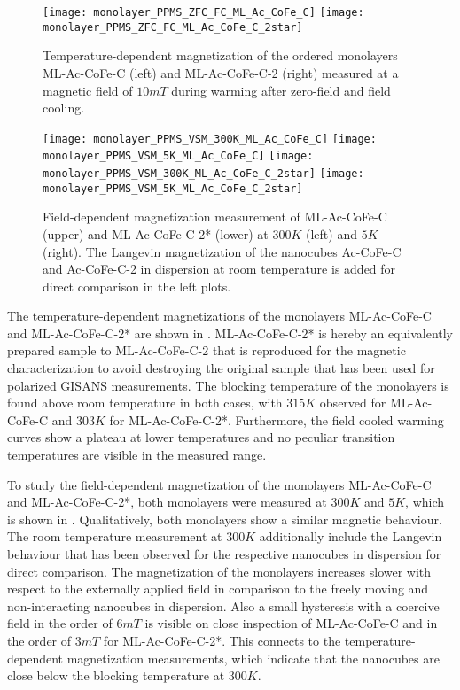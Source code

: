 \documentclass[\main/dresen_thesis.tex]{subfiles}
\begin{document}
  \label{sec:monolayers:magneticStructure:vsm}
  \begin{figure}[tb]
    \centering
    \texttt{[image: monolayer\_PPMS\_ZFC\_FC\_ML\_Ac\_CoFe\_C]}
    \texttt{[image: monolayer\_PPMS\_ZFC\_FC\_ML\_Ac\_CoFe\_C\_2star]}
    \caption{\label{fig:monolayer:magneticStructure:ppmsZFCFC}Temperature-dependent magnetization of the ordered monolayers ML-Ac-CoFe-C (left) and ML-Ac-CoFe-C-2 (right) measured at a magnetic field of $10 \unit{mT}$ during warming after zero-field and field cooling.}
  \end{figure}

  \begin{figure}[!htbp]
    \centering
    \texttt{[image: monolayer\_PPMS\_VSM\_300K\_ML\_Ac\_CoFe\_C]}
    \texttt{[image: monolayer\_PPMS\_VSM\_5K\_ML\_Ac\_CoFe\_C]}
    \texttt{[image: monolayer\_PPMS\_VSM\_300K\_ML\_Ac\_CoFe\_C\_2star]}
    \texttt{[image: monolayer\_PPMS\_VSM\_5K\_ML\_Ac\_CoFe\_C\_2star]}
    \caption{\label{fig:monolayer:magneticStructure:MLAcCoFeC12}Field-dependent magnetization measurement of ML-Ac-CoFe-C (upper) and ML-Ac-CoFe-C-2* (lower) at $300 \unit{K}$ (left) and $5 \unit{K}$ (right). The Langevin magnetization of the nanocubes Ac-CoFe-C and Ac-CoFe-C-2 in dispersion at room temperature is added for direct comparison in the left plots.}
  \end{figure}

  The temperature-dependent magnetizations of the monolayers ML-Ac-CoFe-C and ML-Ac-CoFe-C-2* are shown in .
  ML-Ac-CoFe-C-2* is hereby an equivalently prepared sample to ML-Ac-CoFe-C-2 that is reproduced for the magnetic characterization to avoid destroying the original sample that has been used for polarized GISANS measurements.
  The blocking temperature of the monolayers is found above room temperature in both cases, with $315 \unit{K}$ observed for ML-Ac-CoFe-C and $303 \unit{K}$ for ML-Ac-CoFe-C-2*.
  Furthermore, the field cooled warming curves show a plateau at lower temperatures and no peculiar transition temperatures are visible in the measured range.

  To study the field-dependent magnetization of the monolayers ML-Ac-CoFe-C and ML-Ac-CoFe-C-2*, both monolayers were measured at $300 \unit{K}$ and $5 \unit{K}$, which is shown in . Qualitatively, both monolayers show a similar magnetic behaviour.
  The room temperature measurement at $300 \unit{K}$ additionally include the Langevin behaviour that has been observed for the respective nanocubes in dispersion for direct comparison.
  The magnetization of the monolayers increases slower with respect to the externally applied field in comparison to the freely moving and non-interacting nanocubes in dispersion.
  Also a small hysteresis with a coercive field in the order of $6 \unit{mT}$ is visible on close inspection of ML-Ac-CoFe-C and in the order of $3 \unit{mT}$ for ML-Ac-CoFe-C-2*.
  This connects to the temperature-dependent magnetization measurements, which indicate that the nanocubes are close below the blocking temperature at $300 \unit{K}$.
\end{document}
